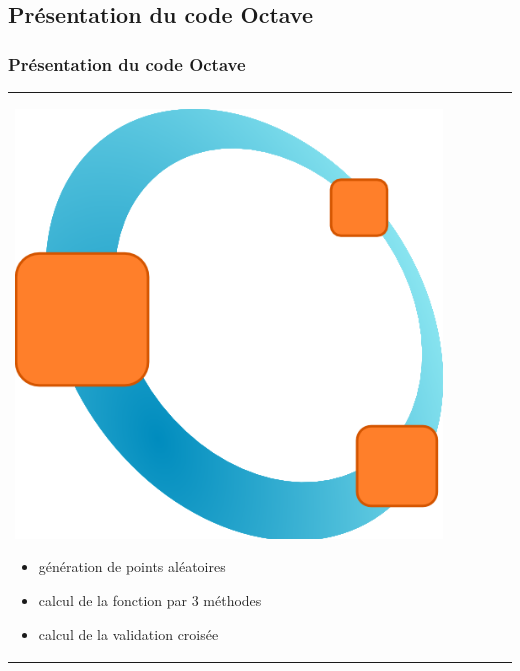 \documentclass[handout]{beamer}
\begin{document}
	\subsection{Présentation du code Octave}
		\begin{frame}
		\frametitle{Présentation du code Octave}
		\begin{tabular}{l l}
			\begin{minipage}{0.4\textwidth}
				\begin{center}
					\includegraphics[width=0.9\textwidth]{images/octave.png}
				\end{center}
			\end{minipage}

			\begin{minipage}{0.6\textwidth}
				\begin{itemize}
					\item génération de points aléatoires 
					\item calcul de la fonction par 3 méthodes 
					\item calcul de la validation croisée
				\end{itemize}
			\end{minipage}

		\end{tabular}
		\end{frame}

\end{document}
